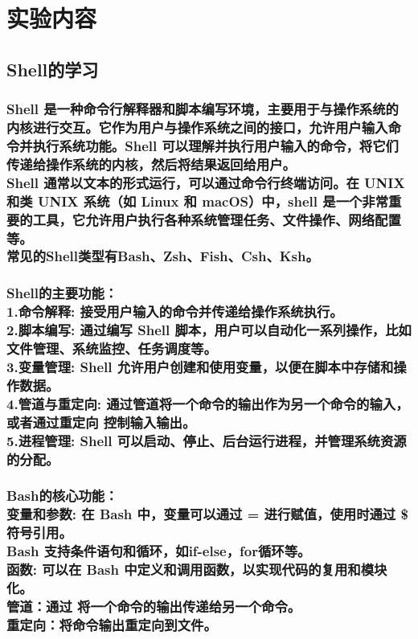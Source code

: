 \documentclass[UTF8,a4paper]{ctexart}
\begin{document}
\begin{sloppypar}
	\section{实验内容}
	\subsection{Shell的学习}
	\subsubsection{Shell 是一种命令行解释器和脚本编写环境，主要用于与操作系统的内核进行交互。它作为用户与操作系统之间的接口，允许用户输入命令并执行系统功能。Shell 可以理解并执行用户输入的命令，将它们传递给操作系统的内核，然后将结果返回给用户。\\Shell 通常以文本的形式运行，可以通过命令行终端访问。在 UNIX 和类 UNIX 系统（如 Linux 和 macOS）中，shell 是一个非常重要的工具，它允许用户执行各种系统管理任务、文件操作、网络配置等。\\常见的Shell类型有Bash、Zsh、Fish、Csh、Ksh。}
	\subsubsection{Shell的主要功能：\\1.命令解释: 接受用户输入的命令并传递给操作系统执行。\\2.脚本编写: 通过编写 Shell 脚本，用户可以自动化一系列操作，比如文件管理、系统监控、任务调度等。\\3.变量管理: Shell 允许用户创建和使用变量，以便在脚本中存储和操作数据。\\4.管道与重定向: 通过管道将一个命令的输出作为另一个命令的输入，或者通过重定向 控制输入输出。\\5.进程管理: Shell 可以启动、停止、后台运行进程，并管理系统资源的分配。}
	\subsubsection{Bash的核心功能：\\变量和参数: 在 Bash 中，变量可以通过 = 进行赋值，使用时通过 \$ 符号引用。\\Bash 支持条件语句和循环，如if-else，for循环等。\\函数: 可以在 Bash 中定义和调用函数，以实现代码的复用和模块化。\\管道：通过 \textbar 将一个命令的输出传递给另一个命令。\\重定向：将命令输出重定向到文件。}
	
	\newpage
	

\end{sloppypar}
\end{document}
